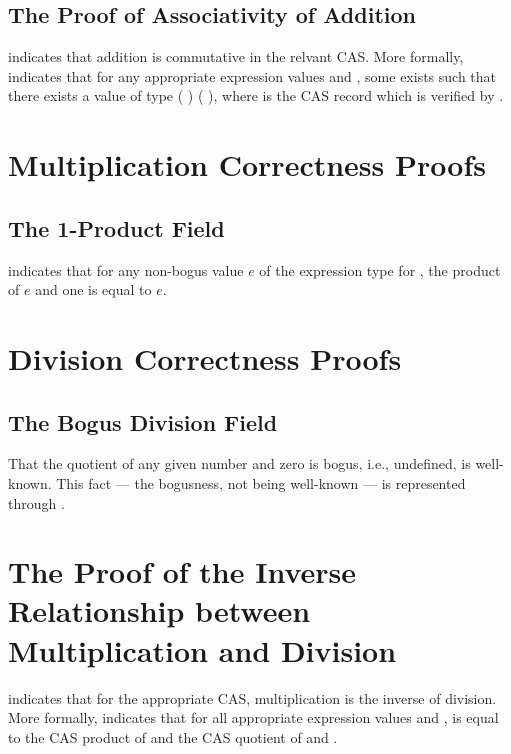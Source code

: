 \documentclass{report}
\begin{document}
\subsection{The Proof of Associativity of Addition}
 indicates that addition is commutative in the relvant CAS.  More formally,   indicates that for any appropriate expression values  and , some  exists such that there exists a value of type   \AgdaSymbol(   \AgdaSymbol) \AgdaSymbol(   \AgdaSymbol), where  is the CAS record which is verified by .

\section{Multiplication Correctness Proofs}

\subsection{The 1-Product Field}
  indicates that for any non-bogus value \(e\) of the expression type for , the product of \(e\) and one is equal to \(e\).

\section{Division Correctness Proofs}

\subsection{The Bogus Division Field}
That the quotient of any given number and zero is bogus, i.e., undefined, is well-known.  This fact --- the bogusness, not being well-known --- is represented through .

\section{The Proof of the Inverse Relationship between Multiplication and Division}
 indicates that for the appropriate CAS, multiplication is the inverse of division.  More formally,   indicates that for all appropriate expression values  and ,  is equal to the  CAS product of  and the  CAS quotient of  and .
\end{document}
